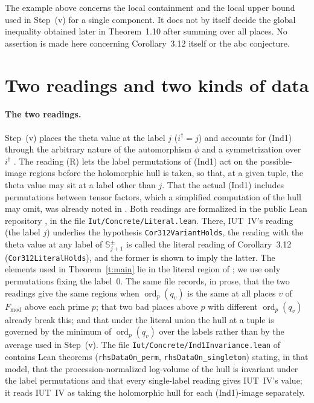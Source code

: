 \documentclass[11pt]{amsart}
\theoremstyle{remark}
\newcommand{\Fmod}{F_{\mathrm{mod}}}
\newcommand{\Sj}{\mathbb S^{\pm}_{j+1}}
\begin{document}
The example above concerns the local containment and the local upper bound used in Step~(v) for a single
component. It does not by itself decide the global
inequality obtained later in Theorem~1.10 after summing over all places. No assertion is made here concerning
Corollary~3.12 itself or the abc conjecture.

\section{Two readings and two kinds of data}\label{s:readings}

\paragraph{The two readings.}
Step~(v) places the theta value at the label $j$ ($i^\dagger=j$) and accounts for (Ind1) through the
arbitrary nature of the automorphism $\phi$ and a symmetrization over $i^\dagger$ \cite[pp.~27--28]{IUT4}.
The reading \textup{(R)} lets the label permutations of (Ind1) act on the possible-image regions before the
holomorphic hull is taken, so that, at a given tuple, the theta value may sit at a label other than $j$.
That the actual (Ind1) includes permutations between tensor factors, which a simplified computation of the hull
may omit, was already noted in \cite[\S6.2, footnote~7]{DH}.
Both readings are formalized in the public Lean repository \cite{LANAiut}, in the file
\texttt{Iut/Concrete/Literal.lean}. There, IUT~IV's reading (the label $j$) underlies the hypothesis
\texttt{Cor312VariantHolds}, the reading with the theta value at any label of $\Sj$ is called the
literal reading of Corollary~3.12 (\texttt{Cor312LiteralHolds}), and the former is shown to imply the
latter. The elements used in Theorem~\ref{t:main} lie in the literal region of \cite{LANAiut}; we use
only permutations fixing the label~$0$. The same file records, in prose, that the two readings give the
same regions when $\operatorname{ord}_p(q_v)$ is the same at all places $v$ of $\Fmod$ above each prime
$p$; that two bad places above $p$ with different $\operatorname{ord}_p(q_v)$ already break this; and
that under the literal union the hull at a tuple is governed by the minimum of
$\operatorname{ord}_p(q_v)$ over the labels rather than by the average used in Step~(v). The file
\texttt{Iut/Concrete/Ind1Invariance.lean} of \cite{LANAiut} contains Lean theorems
(\texttt{rhsDataOn\_perm}, \texttt{rhsDataOn\_singleton}) stating, in that model, that the
procession-normalized log-volume of the hull is invariant under the label permutations and that every
single-label reading gives IUT~IV's value; it reads IUT~IV as taking the holomorphic hull for each
(Ind1)-image separately.
\end{document}
